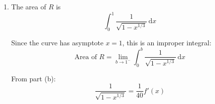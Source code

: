 \documentclass[leqno]{article}
\begin{document}
\begin{enumerate}[
  label=\textbf{\arabic*.},
  leftmargin=*,
  topsep=0pt,
  partopsep=0pt,
  parsep=0pt
]
\begin{djsSolution}
\begin{enumerate}[label=\textbf{(\alph*)}]
  Now
  \[
  \theta=\arccos(x^{1/6})
  \]

  and
  \[
  \frac{\mathrm{d}}{\mathrm{d}x}\bigl(\arccos u\bigr)=-\frac{1}{\sqrt{1-u^2}}\frac{\mathrm{d}u}{\mathrm{d}x}
  \]

  Here \(u=x^{1/6}\), so
  \[
  \frac{\mathrm{d}u}{\mathrm{d}x}=\frac16x^{-5/6}
  \]

  and therefore
  \begin{align*}
  \frac{\mathrm{d}\theta}{\mathrm{d}x}
  &=-\frac{1}{\sqrt{1-(x^{1/6})^2}}\times\frac16x^{-5/6} \\
  &=-\frac{x^{-5/6}}{6\sqrt{1-x^{1/3}}}
  \end{align*}

  Substitute this into the expression for \(f'(x)\):
  \begin{align*}
  f'(x)
  &=-(15\cos 5\theta+75\cos 3\theta+150\cos\theta)\left(-\frac{x^{-5/6}}{6\sqrt{1-x^{1/3}}}\right) \\
  &=\frac{x^{-5/6}}{6\sqrt{1-x^{1/3}}}(15\cos 5\theta+75\cos 3\theta+150\cos\theta) \\
  &=\frac{5}{2}\times\frac{x^{-5/6}}{\sqrt{1-x^{1/3}}}\bigl(\cos 5\theta+5\cos 3\theta+10\cos\theta\bigr)
  \end{align*}

  From part (a):
  \[
  \cos^5\theta=\frac1{16}\cos 5\theta+\frac5{16}\cos 3\theta+\frac58\cos\theta
  \]

  Multiply by \(16\):
  \[
  16\cos^5\theta=\cos 5\theta+5\cos 3\theta+10\cos\theta
  \]

  So
  \[
  f'(x)=\frac{5}{2}\times\frac{x^{-5/6}}{\sqrt{1-x^{1/3}}}\times 16\cos^5\theta
  \]

  But \(\cos\theta=x^{1/6}\), so
  \[
  \cos^5\theta=\left(x^{1/6}\right)^5=x^{5/6}
  \]

  Hence
  \begin{align*}
  f'(x)
  &=\frac{5}{2}\times\frac{x^{-5/6}}{\sqrt{1-x^{1/3}}}\times 16x^{5/6} \\
  &=\frac{40}{\sqrt{1-x^{1/3}}}
  \end{align*}

  \item The area of \(R\) is
  \[
  \int_0^1 \frac{1}{\sqrt{1-x^{1/3}}}\,\mathrm{d}x
  \]

  Since the curve has asymptote \(x=1\), this is an improper integral:
  \[
  \text{Area of }R=\lim_{b\to 1^-}\int_0^b \frac{1}{\sqrt{1-x^{1/3}}}\,\mathrm{d}x
  \]

  From part (b):
  \[
  \frac{1}{\sqrt{1-x^{1/3}}}=\frac1{40}f'(x)
  \]


\end{enumerate}
\end{djsSolution}
\end{enumerate}
\end{document}
